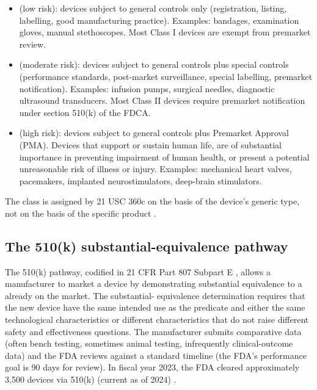 \begin{itemize}[leftmargin=*]
\item {} (low risk): devices subject to general
  controls only (registration, listing, labelling, good
  manufacturing practice). Examples: bandages, examination gloves,
  manual stethoscopes. Most Class I devices are exempt from
  premarket review.
\item {} (moderate risk): devices subject to
  general controls plus special controls (performance standards,
  post-market surveillance, special labelling, premarket
  notification). Examples: infusion pumps, surgical needles,
  diagnostic ultrasound transducers. Most Class II devices require
  premarket notification under section 510(k) of the FDCA.
\item {} (high risk): devices subject to general
  controls plus Premarket Approval (PMA). Devices that support or
  sustain human life, are of substantial importance in preventing
  impairment of human health, or present a potential unreasonable
  risk of illness or injury. Examples: mechanical heart valves,
  pacemakers, implanted neurostimulators, deep-brain stimulators.
\end{itemize}

The class is assigned by 21 USC 360c on the basis of the device's
generic type, not on the basis of the specific product
\cite{law:v6c12-21usc-360c}.

\subsection{The 510(k) substantial-equivalence pathway}

The 510(k) pathway, codified in 21 CFR Part 807 Subpart E
\cite{law:v6c12-21cfr-807}, allows a manufacturer to market a
device by demonstrating substantial equivalence to a
 already on the market. The substantial-
equivalence determination requires that the new device have the
same intended use as the predicate and either the same
technological characteristics or different characteristics that do
not raise different safety and effectiveness questions. The
manufacturer submits comparative data (often bench testing,
sometimes animal testing, infrequently clinical-outcome data) and
the FDA reviews against a standard timeline (the FDA's
performance goal is 90 days for review). In fiscal year 2023, the
FDA cleared approximately 3,500 devices via 510(k) (current as of
2024) \cite{web:v6c12-fda-510k-database-2024}.

